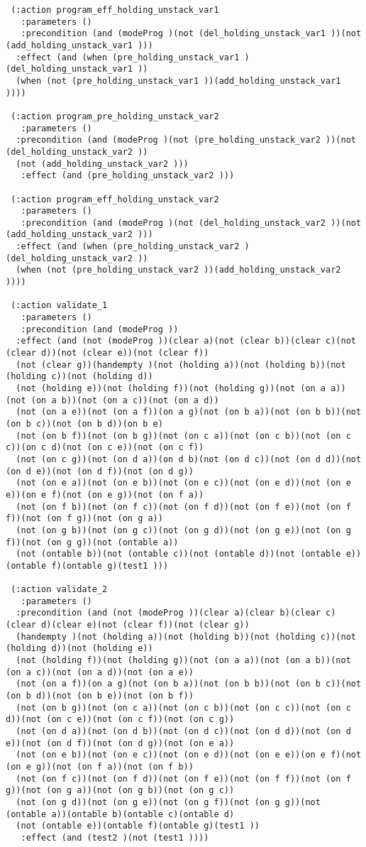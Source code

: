 \begin{scriptsize}
\begin{verbatim}
 (:action program_eff_holding_unstack_var1
   :parameters ()
   :precondition (and (modeProg )(not (del_holding_unstack_var1 ))(not (add_holding_unstack_var1 )))
  :effect (and (when (pre_holding_unstack_var1 )(del_holding_unstack_var1 ))
  (when (not (pre_holding_unstack_var1 ))(add_holding_unstack_var1 ))))

 (:action program_pre_holding_unstack_var2
   :parameters ()
  :precondition (and (modeProg )(not (pre_holding_unstack_var2 ))(not (del_holding_unstack_var2 ))
  (not (add_holding_unstack_var2 )))
   :effect (and (pre_holding_unstack_var2 )))

 (:action program_eff_holding_unstack_var2
   :parameters ()
   :precondition (and (modeProg )(not (del_holding_unstack_var2 ))(not (add_holding_unstack_var2 )))
  :effect (and (when (pre_holding_unstack_var2 )(del_holding_unstack_var2 ))
  (when (not (pre_holding_unstack_var2 ))(add_holding_unstack_var2 ))))

 (:action validate_1
   :parameters ()
   :precondition (and (modeProg ))
  :effect (and (not (modeProg ))(clear a)(not (clear b))(clear c)(not (clear d))(not (clear e))(not (clear f))
  (not (clear g))(handempty )(not (holding a))(not (holding b))(not (holding c))(not (holding d))
  (not (holding e))(not (holding f))(not (holding g))(not (on a a))(not (on a b))(not (on a c))(not (on a d))
  (not (on a e))(not (on a f))(on a g)(not (on b a))(not (on b b))(not (on b c))(not (on b d))(on b e)
  (not (on b f))(not (on b g))(not (on c a))(not (on c b))(not (on c c))(on c d)(not (on c e))(not (on c f))
  (not (on c g))(not (on d a))(on d b)(not (on d c))(not (on d d))(not (on d e))(not (on d f))(not (on d g))
  (not (on e a))(not (on e b))(not (on e c))(not (on e d))(not (on e e))(on e f)(not (on e g))(not (on f a))
  (not (on f b))(not (on f c))(not (on f d))(not (on f e))(not (on f f))(not (on f g))(not (on g a))
  (not (on g b))(not (on g c))(not (on g d))(not (on g e))(not (on g f))(not (on g g))(not (ontable a))
  (not (ontable b))(not (ontable c))(not (ontable d))(not (ontable e))(ontable f)(ontable g)(test1 )))

 (:action validate_2
   :parameters ()
  :precondition (and (not (modeProg ))(clear a)(clear b)(clear c)(clear d)(clear e)(not (clear f))(not (clear g))
  (handempty )(not (holding a))(not (holding b))(not (holding c))(not (holding d))(not (holding e))
  (not (holding f))(not (holding g))(not (on a a))(not (on a b))(not (on a c))(not (on a d))(not (on a e))
  (not (on a f))(on a g)(not (on b a))(not (on b b))(not (on b c))(not (on b d))(not (on b e))(not (on b f))
  (not (on b g))(not (on c a))(not (on c b))(not (on c c))(not (on c d))(not (on c e))(not (on c f))(not (on c g))
  (not (on d a))(not (on d b))(not (on d c))(not (on d d))(not (on d e))(not (on d f))(not (on d g))(not (on e a))
  (not (on e b))(not (on e c))(not (on e d))(not (on e e))(on e f)(not (on e g))(not (on f a))(not (on f b))
  (not (on f c))(not (on f d))(not (on f e))(not (on f f))(not (on f g))(not (on g a))(not (on g b))(not (on g c))
  (not (on g d))(not (on g e))(not (on g f))(not (on g g))(not (ontable a))(ontable b)(ontable c)(ontable d)
  (not (ontable e))(ontable f)(ontable g)(test1 ))
   :effect (and (test2 )(not (test1 ))))


\end{verbatim}
\end{scriptsize}
